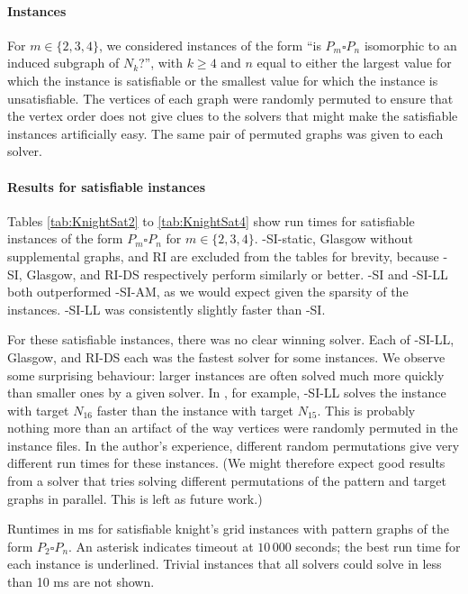 \paragraph{Instances}

For $m \in \{2,3,4\}$, we considered instances of the form ``is $P_m \square P_n$ isomorphic
to an induced subgraph of $N_k$?'', with $k \geq 4$ and $n$ equal to either the largest value for which
the instance is satisfiable or the smallest value for which the instance is unsatisfiable.
The vertices of each graph were randomly permuted to ensure that the vertex
order does not give clues to the solvers that might make the satisfiable
instances artificially easy.  The same pair of permuted graphs was given to
each solver.

\paragraph{Results for satisfiable instances}
Tables \ref{tab:KnightSat2} to \ref{tab:KnightSat4} show run times for satisfiable instances
of the form $P_m \square P_n$ for $m \in \{2,3,4\}$.
\McSplit-SI-static, Glasgow without supplemental graphs, and RI are excluded from the tables for brevity,
because \McSplit-SI, Glasgow, and RI-DS respectively perform similarly or better.
\McSplit-SI and \McSplit-SI-LL both outperformed \McSplit-SI-AM, as we would expect given the
sparsity of the instances. \McSplit-SI-LL was consistently slightly faster than \McSplit-SI.

For these satisfiable instances, there was no clear winning solver. Each of
\McSplit-SI-LL, Glasgow, and RI-DS each was the fastest solver for some
instances.  We observe some surprising behaviour: larger instances are often
solved much more quickly than smaller ones by a given solver. In
, for example, \McSplit-SI-LL solves the instance with
target $N_{16}$ faster than the instance with target $N_{15}$.  This is
probably nothing more than an artifact of the way vertices were randomly
permuted in the instance files. In the author's experience, different random
permutations give very different run times for these instances.  (We might
therefore expect good results from a solver that tries solving different
permutations of the pattern and target graphs in parallel.  This is left as
future work.)

\begin{table}[htb]
\centering
\footnotesize
    
\caption{Runtimes in ms for satisfiable knight's grid instances with pattern graphs of
        the form $P_2 \square P_n$.  An asterisk indicates timeout at $10\,000$ seconds;
        the best run time for each instance is underlined.  Trivial instances that all solvers
        could solve in less than 10 ms are not shown.}
\label{tab:KnightSat2}
\end{table}

